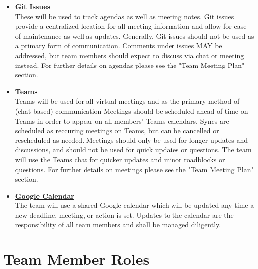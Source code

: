 \documentclass{article}
\begin{document}
\begin{itemize}
	\item \textbf{\underline{Git Issues}} \\
	These will be used to track agendas as well as meeting notes. 
	Git issues provide a centralized location for all meeting information and allow for ease of maintenance as well as updates. 
	Generally, Git issues should not be used as a primary form of communication.
	 Comments under issues MAY be addressed, but team members should expect to discuss via chat or meeting instead.
	For further details on agendas please see the "Team Meeting Plan" section.\\
	\item \textbf{\underline{Teams}} \\
	Teams will be used for all virtual meetings and as the primary method of (chat-based) communication 
	Meetings should be scheduled ahead of time on Teams in order to appear on all members' Teams calendars.
	Syncs are scheduled as reccuring meetings on Teams, but can be cancelled or rescheduled as needed.
	Meetings should only be used for longer updates and discussions, and should not be used for quick updates or questions.
	The team will use the Teams chat for quicker updates and minor roadblocks or questions.
	For further details on meetings please see the "Team Meeting Plan" section. \\
	\item \textbf{\underline{Google Calendar}} \\
	The team will use a shared Google calendar which will be updated any time a new deadline, meeting, or action is set. 
	Updates to the calendar are the responsibility of all team members and shall be managed diligently. \\
\end{itemize}



\section{Team Member Roles}
\end{document}
